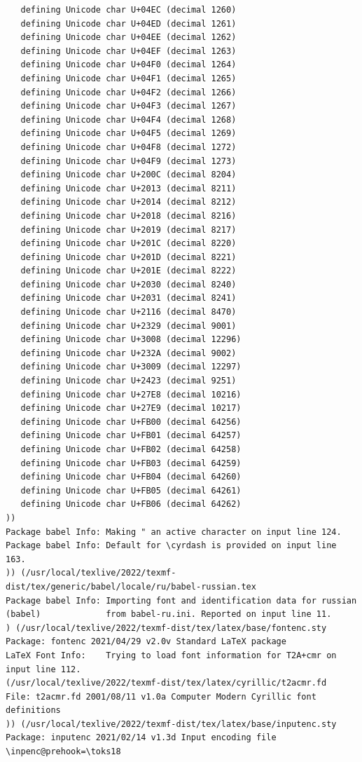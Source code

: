 \documentclass{article}
\begin{document}
\begin{verbatim}
   defining Unicode char U+04EC (decimal 1260)
   defining Unicode char U+04ED (decimal 1261)
   defining Unicode char U+04EE (decimal 1262)
   defining Unicode char U+04EF (decimal 1263)
   defining Unicode char U+04F0 (decimal 1264)
   defining Unicode char U+04F1 (decimal 1265)
   defining Unicode char U+04F2 (decimal 1266)
   defining Unicode char U+04F3 (decimal 1267)
   defining Unicode char U+04F4 (decimal 1268)
   defining Unicode char U+04F5 (decimal 1269)
   defining Unicode char U+04F8 (decimal 1272)
   defining Unicode char U+04F9 (decimal 1273)
   defining Unicode char U+200C (decimal 8204)
   defining Unicode char U+2013 (decimal 8211)
   defining Unicode char U+2014 (decimal 8212)
   defining Unicode char U+2018 (decimal 8216)
   defining Unicode char U+2019 (decimal 8217)
   defining Unicode char U+201C (decimal 8220)
   defining Unicode char U+201D (decimal 8221)
   defining Unicode char U+201E (decimal 8222)
   defining Unicode char U+2030 (decimal 8240)
   defining Unicode char U+2031 (decimal 8241)
   defining Unicode char U+2116 (decimal 8470)
   defining Unicode char U+2329 (decimal 9001)
   defining Unicode char U+3008 (decimal 12296)
   defining Unicode char U+232A (decimal 9002)
   defining Unicode char U+3009 (decimal 12297)
   defining Unicode char U+2423 (decimal 9251)
   defining Unicode char U+27E8 (decimal 10216)
   defining Unicode char U+27E9 (decimal 10217)
   defining Unicode char U+FB00 (decimal 64256)
   defining Unicode char U+FB01 (decimal 64257)
   defining Unicode char U+FB02 (decimal 64258)
   defining Unicode char U+FB03 (decimal 64259)
   defining Unicode char U+FB04 (decimal 64260)
   defining Unicode char U+FB05 (decimal 64261)
   defining Unicode char U+FB06 (decimal 64262)
))
Package babel Info: Making " an active character on input line 124.
Package babel Info: Default for \cyrdash is provided on input line 163.
)) (/usr/local/texlive/2022/texmf-dist/tex/generic/babel/locale/ru/babel-russian.tex
Package babel Info: Importing font and identification data for russian
(babel)             from babel-ru.ini. Reported on input line 11.
) (/usr/local/texlive/2022/texmf-dist/tex/latex/base/fontenc.sty
Package: fontenc 2021/04/29 v2.0v Standard LaTeX package
LaTeX Font Info:    Trying to load font information for T2A+cmr on input line 112.
(/usr/local/texlive/2022/texmf-dist/tex/latex/cyrillic/t2acmr.fd
File: t2acmr.fd 2001/08/11 v1.0a Computer Modern Cyrillic font definitions
)) (/usr/local/texlive/2022/texmf-dist/tex/latex/base/inputenc.sty
Package: inputenc 2021/02/14 v1.3d Input encoding file
\inpenc@prehook=\toks18

\end{verbatim}
\end{document}

